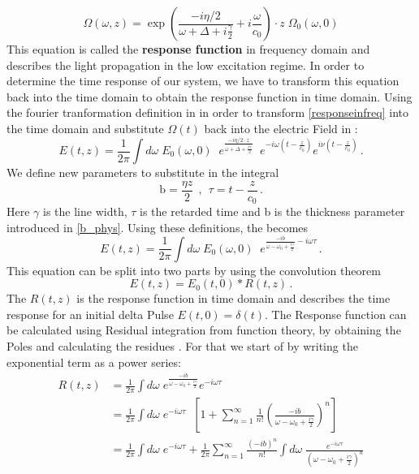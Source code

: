 \begin{equation}
    \Omega(\omega,z) = \exp{\left(\frac{-i \eta /2}{\omega + \Delta + i \frac{\gamma}{2}}  + i \frac{\omega}{c_0}\right) \cdot z} \;\Omega_0(\omega,0) \label{responseinfreq}
\end{equation}
This equation is called the \textbf{response function} in frequency domain and describes the light propagation in the low excitation regime. In order to determine the time response of our system, we have to transform this equation back into the time domain to obtain the response function in time domain. Using the fourier tranformation definition in  in order to transform \cref{responseinfreq} into the time domain and substitute $\Omega(t)$ back into the electric Field in :
\begin{equation}
    E(t,z) = \frac{1}{2\pi} \int d\omega \; E_0(\omega, 0)\;\; e^{\frac{-i\eta/2\cdot z}{\omega+\Delta+ \frac{i \gamma}{2}}}\;\; e^{-i\omega(t-\frac{z}{c_0})}  e^{i\nu (t-\frac{z}{c_0})} \, .\label{Omega_first}
\end{equation}
We define new parameters to substitute in the integral
\begin{equation}
    \mathrm{b} = \frac{\eta z}{2} \,\; ,\; \, \tau = t-\frac{z}{c_0}\, . \label{betazmax}
\end{equation}
Here $\gamma $ is the line width, $\tau$ is the retarded time and b is the thickness parameter introduced in \cref{b_phys}. Using these definitions, the  becomes
\begin{equation}
    E(t,z) = \frac{1}{2\pi} \int d\omega \; E_0(\omega, 0)\;\; e^{\frac{-ib}{\omega-\omega_0+ \frac{i \gamma}{2}} -i\omega \tau}\, .
\end{equation}
This equation can be split into two parts by using the convolution theorem \cite{kagan1979excitation}
\begin{equation}
    E(t,z) = E_0(t,0) \ast R(t,z)\, .
\end{equation}
The $R(t,z)$ is the response function in time domain and describes the time response for an initial delta Pulse $E(t,0) = \delta(t)$. The Response function can be calculated using Residual integration from function theory, by obtaining the Poles and calculating the residues \cite{smirnov1999perturbation,reiser2014time}. For that we start of by writing the exponential term as a power series:
\begin{align}
    R(t,z) &= \frac{1}{2\pi} \int d\omega \; e^{\frac{-i b}{\omega-\omega_0+ \frac{i \gamma}{2}}} e^{-i\omega \tau} \\
    &= \frac{1}{2\pi} \int d\omega \; e^{-i\omega \tau} \;\; \left[ 1+ \sum_{n=1}^\infty \frac{1}{n!} \left(\frac{-ib}{\omega-\omega_0 + \frac{i \gamma}{2}} \right)^n \right] \\
    &= \frac{1}{2\pi} \int d\omega \; e^{-i\omega \tau} + \frac{1}{2\pi}  \sum_{n=1}^\infty \frac{(-ib)^n}{n!} \int d\omega \;  \frac{e^{-i\omega \tau} }{(\omega-\omega_0 + \frac{i \gamma}{2})^n}\label{responsestep1}
\end{align}

